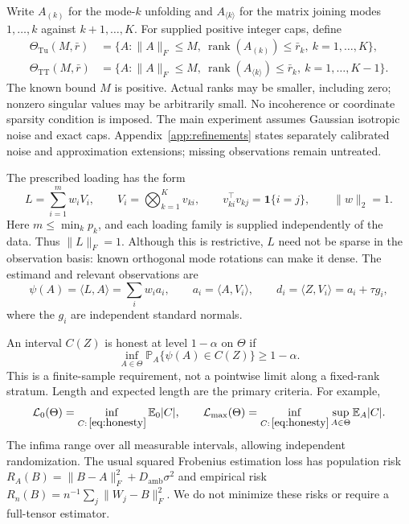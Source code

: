 \documentclass[11pt]{article}
\theoremstyle{remark}
\newcommand{\E}{\mathbb E}
\newcommand{\PP}{\mathbb P}
\newcommand{\ip}[2]{\langle #1,#2\rangle}
\newcommand{\norm}[1]{\lVert #1\rVert}
\newcommand{\rank}{\operatorname{rank}}
\newcommand{\Tu}{\mathrm{Tu}}
\newcommand{\TT}{\mathrm{TT}}
\newcommand{\calL}{\mathcal L}
\begin{document}
Write $A_{(k)}$ for the mode-$k$ unfolding and $A_{\langle k\rangle}$ for the matrix joining modes $1,\ldots,k$ against $k+1,\ldots,K$. For supplied positive integer caps, define
\begin{align}
 \Theta_{\Tu}(M,\bar r)&=\{A:\norm A_F\le M,\ \rank(A_{(k)})\le\bar r_k,\ k=1,\ldots,K\},\label{eq:tucker}\\
 \Theta_{\TT}(M,\bar r)&=\{A:\norm A_F\le M,\ \rank(A_{\langle k\rangle})\le\bar r_k,\ k=1,\ldots,K-1\}.\label{eq:tt}
\end{align}
The known bound $M$ is positive. Actual ranks may be smaller, including zero; nonzero singular values may be arbitrarily small. No incoherence or coordinate sparsity condition is imposed. The main experiment assumes Gaussian isotropic noise and exact caps. Appendix~\ref{app:refinements} states separately calibrated noise and approximation extensions; missing observations remain untreated.

The prescribed loading has the form
\begin{equation}\label{eq:loading}
 L=\sum_{i=1}^m w_i V_i,\qquad
 V_i=\bigotimes_{k=1}^K v_{ki},\qquad
 v_{ki}^\top v_{kj}=\mathbf1\{i=j\},\qquad \norm w_2=1.
\end{equation}
Here $m\le\min_k p_k$, and each loading family is supplied independently of the data. Thus $\norm L_F=1$. Although this is restrictive, $L$ need not be sparse in the observation basis: known orthogonal mode rotations can make it dense. The estimand and relevant observations are
\begin{equation}\label{eq:diagonal}
 \psi(A)=\ip LA=\sum_iw_i a_i,\qquad
 a_i=\ip A{V_i},\qquad d_i=\ip Z{V_i}=a_i+\tau g_i,
\end{equation}
where the $g_i$ are independent standard normals.

An interval $C(Z)$ is honest at level $1-\alpha$ on $\Theta$ if
\begin{equation}\label{eq:honesty}
 \inf_{A\in\Theta}\PP_A\{\psi(A)\in C(Z)\}\ge1-\alpha.
\end{equation}
This is a finite-sample requirement, not a pointwise limit along a fixed-rank stratum. Length and expected length are the primary criteria. For example,
\begin{equation}\label{eq:minimaxcriteria}
 \calL_0(\Theta)=\inf_{C:\,\eqref{eq:honesty}}\E_0|C|,
 \qquad \calL_{\max}(\Theta)=\inf_{C:\,\eqref{eq:honesty}}\sup_{A\in\Theta}\E_A|C|.
\end{equation}
The infima range over all measurable intervals, allowing independent randomization. The usual squared Frobenius estimation loss has population risk $R_A(B)=\norm{B-A}_F^2+D_{\mathrm{amb}}\sigma^2$ and empirical risk $R_n(B)=n^{-1}\sum_j\norm{W_j-B}_F^2$. We do not minimize these risks or require a full-tensor estimator.
\end{document}
